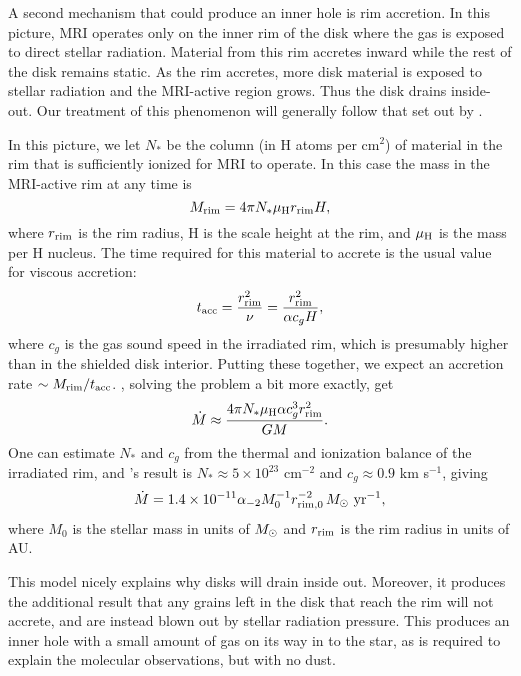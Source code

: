 A second mechanism that could produce an inner hole is rim accretion. In this picture, MRI operates only on the inner rim of the disk where the gas is exposed to direct stellar radiation. Material from this rim accretes inward while the rest of the disk remains static. As the rim accretes, more disk material is exposed to stellar radiation and the MRI-active region grows. Thus the disk drains inside-out. Our treatment of this phenomenon will generally follow that set out by \citet{chiang07a}.

In this picture, we let $N_*$ be the column (in H atoms per cm$^2$) of material in the rim that is sufficiently ionized for MRI to operate. In this case the mass in the MRI-active rim at any time is
\begin{equation}
M_{\rm rim} = 4\pi N_* \mu_{\rm H} r_{\rm rim} H,
\end{equation}
where $r_{\rm rim}$ is the rim radius, H is the scale height at the rim, and $\mu_{\rm H}$ is the mass per H nucleus. The time required for this material to accrete is the usual value for viscous accretion:
\begin{equation}
t_{\rm acc} = \frac{r_{\rm rim}^2}{\nu} = \frac{r_{\rm rim}^2}{\alpha c_g H},
\end{equation}
where $c_g$ is the gas sound speed in the irradiated rim, which is presumably higher than in the shielded disk interior. Putting these together, we expect an accretion rate $\sim M_{\rm rim}/t_{\rm acc}$. \citet{chiang07a}, solving the problem a bit more exactly, get
\begin{equation}
\dot{M} \approx \frac{4\pi N_* \mu_{\rm H} \alpha c_g^3 r_{\rm rim}^2}{G M}.
\end{equation}
One can estimate $N_*$ and $c_g$ from the thermal and ionization balance of the irradiated rim, and \citet{chiang07a}'s result is $N_* \approx 5\times 10^{23}$ cm$^{-2}$ and $c_g \approx 0.9$ km s$^{-1}$, giving
\begin{equation}
\dot{M} = 1.4\times 10^{-11} \alpha_{-2} M_0^{-1} r_{\rm rim,0}^{-2} \,M_{\odot}\mbox{ yr}^{-1},
\end{equation} 
where $M_0$ is the stellar mass in units of $M_{\odot}$ and $r_{\rm rim}$ is the rim radius in units of AU.

This model nicely explains why disks will drain inside out. Moreover, it produces the additional result that any grains left in the disk that reach the rim will not accrete, and are instead blown out by stellar radiation pressure. This produces an inner hole with a small amount of gas on its way in to the star, as is required to explain the molecular observations, but with no dust.

